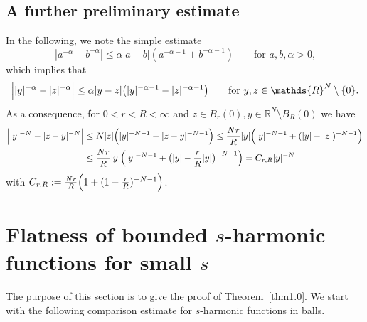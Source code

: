 \documentclass[notitlepage,11pt,reqno]{amsart}
\theoremstyle{definition}
\numberwithin{equation}{section}
\newcommand{\loc}{\mathrm{loc}}
\newcommand{\R}{\mathds{R}}
\newcommand{\RR}{\mathds{R}}
\begin{document}


\subsection{A further preliminary estimate}
\label{sec:furth-prel-results}


In the following, we note the simple estimate
$$
|a^{-\alpha}-b^{-\alpha}|\le \alpha |a-b|(a^{-\alpha-1} + b^{-\alpha-1}) \qquad \text{for $a,b,\alpha>0$,}
$$
which implies that
\begin{equation}
  \label{alpha-est}
\Bigl||y|^{-\alpha}-|z|^{-\alpha} \Bigr|\le \alpha |y-z|\bigl(|y|^{-\alpha-1}-|z|^{-\alpha-1}\bigr) \qquad \text{for $y,z \in \R^N \setminus \{0\}$.}  
\end{equation}
As a consequence, for $0<r<R< \infty$ and $z \in B_{r}(0), y \in \RR^N \setminus B_R(0)$ we have 
\begin{align}\label{crR estimate}
\Bigl||y|^{-N}- |z-y|^{-N}\Bigr| &\le N|z| \Bigl(|y|^{-N-1}+|z-y|^{-N-1}\Bigr) \le  \frac{Nr}{R}|y| \Bigl(|y|^{-N-1}+(|y|-|z|)^{-N-1}\Bigr)\nonumber\\
                                   & \le \frac{Nr}{R}|y| \Bigl(|y|^{-N-1}+\bigl(|y|-\frac{r}{R}|y|\bigr)^{-N-1}\Bigr)
 = C_{r,R}|y|^{-N}
\end{align}
with $C_{r,R}:= \frac{Nr}{R}\Bigl( 1+ (1-\frac{r}{R})^{-N-1}\Bigr)$.

\section{Flatness of bounded \texorpdfstring{$s$}{s}-harmonic functions for small \texorpdfstring{$s$}{s}}
\label{sec:flatness-bounded-s}

The purpose of this section is to give the proof of Theorem~\ref{thm1.0}. We start with the following comparison estimate for $s$-harmonic functions in balls. 
\end{document}

